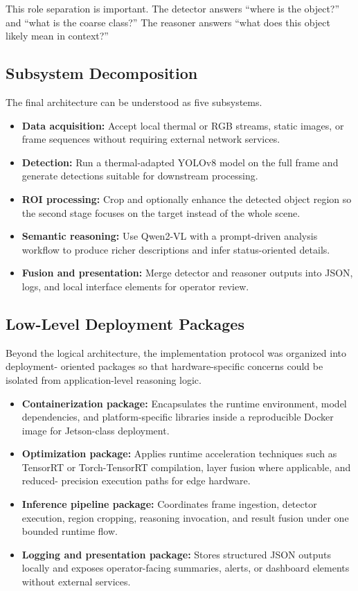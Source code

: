 This role separation is important. The detector answers ``where is the object?'' and ``what
is the coarse class?'' The reasoner answers ``what does this object likely mean in context?''

\subsection{Subsystem Decomposition}

The final architecture can be understood as five subsystems.

\begin{itemize}[nosep]
  \item \textbf{Data acquisition:} Accept local thermal or RGB streams, static images, or
    frame sequences without requiring external network services.
  \item \textbf{Detection:} Run a thermal-adapted YOLOv8 model on the full frame and
    generate detections suitable for downstream processing.
  \item \textbf{ROI processing:} Crop and optionally enhance the detected object region so
    the second stage focuses on the target instead of the whole scene.
  \item \textbf{Semantic reasoning:} Use Qwen2-VL with a prompt-driven analysis workflow
    to produce richer descriptions and infer status-oriented details.
  \item \textbf{Fusion and presentation:} Merge detector and reasoner outputs into JSON,
    logs, and local interface elements for operator review.
\end{itemize}

\subsection{Low-Level Deployment Packages}

Beyond the logical architecture, the implementation protocol was organized into deployment-
oriented packages so that hardware-specific concerns could be isolated from application-level
reasoning logic.

\begin{itemize}[nosep]
  \item \textbf{Containerization package:} Encapsulates the runtime environment, model
    dependencies, and platform-specific libraries inside a reproducible Docker image for
    Jetson-class deployment.
  \item \textbf{Optimization package:} Applies runtime acceleration techniques such as
    TensorRT or Torch-TensorRT compilation, layer fusion where applicable, and reduced-
    precision execution paths for edge hardware.
  \item \textbf{Inference pipeline package:} Coordinates frame ingestion, detector
    execution, region cropping, reasoning invocation, and result fusion under one bounded
    runtime flow.
  \item \textbf{Logging and presentation package:} Stores structured JSON outputs locally
    and exposes operator-facing summaries, alerts, or dashboard elements without external
    services.
\end{itemize}

